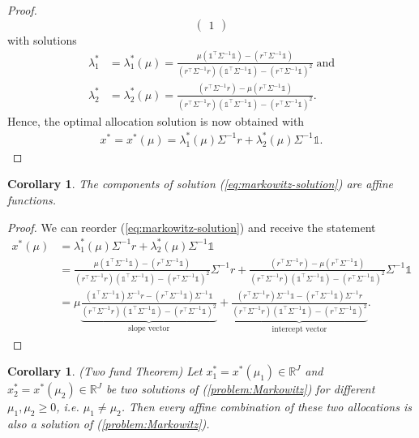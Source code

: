 \documentclass[a4paper, english, 11pt, onecolumn, oneside, final]{article}
\numberwithin{equation}{section}   %
\newcommand{\R}{\mathbb{R}}                 %
\newcommand{\one}{\mathds 1}
\newcommand{\precision}{\Sigma^{-1}}
\newcommand{\A}{r^\top\Sigma^{-1} r}
\newcommand{\B}{r^\top\Sigma^{-1}\one}
\newcommand{\C}{\one^\top\Sigma^{-1}\one}
\newcommand{\D}{(\A)(\C)-(\B)^2}
\theoremstyle{plain}
\newtheorem{corollary}  [theorem]{Corollary}
\theoremstyle{definition}
\theoremstyle{remark}
\begin{document}
\begin{proof}
\begin{equation*}
\begin{pmatrix}
            1
        \end{pmatrix}
    \end{equation*}
    with solutions 
    \begin{equation*}
        \begin{aligned}
            \lambda_1^* &= \lambda_1^*(\mu) = \frac{\mu(\C)-(\B)}{(\A)(\C)-(\B)^2}\;\text{and} \\
            \lambda_2^* &= \lambda_2^*(\mu) = \frac{(\A)-\mu(\B)}{(\A)(\C)-(\B)^2}.
        \end{aligned}
    \end{equation*}
    Hence, the optimal allocation solution is now obtained with
    \begin{equation*}
        \begin{aligned}
            x^* = x^*(\mu) = \lambda_1^*(\mu)\precision r + \lambda_2^*(\mu)\precision\one.
        \end{aligned}
    \end{equation*}
\end{proof}
\begin{corollary}
\label{cor:AffineFunction}
    The components of solution (\ref{eq:markowitz-solution}) are affine functions.
\end{corollary}
\begin{proof}
    We can reorder (\ref{eq:markowitz-solution}) and receive the statement
    \begin{equation}
    \label{eq:AffineFunction}
        \begin{aligned}
            x^*(\mu) &=
            \lambda_1^*(\mu)\precision r + \lambda_2^*(\mu)\precision\one \\
            &= \frac{\mu(\C)-(\B)}{(\A)(\C)-(\B)^2}\precision r + \frac{(\A)-\mu(\B)}{(\A)(\C)-(\B)^2}\precision\one \\
            &= \mu\underbrace{\frac{(\C)\precision r - (\B)\precision\one}{\D}}_{\text{slope vector}} + \underbrace{\frac{(\A)\precision\one - (\B)\precision r}{\D}}_{\text{intercept vector}}.
        \end{aligned}
    \end{equation}
\end{proof}
\begin{corollary}\emph{(Two fund Theorem)}
\label{cor:TwoFundTheorem}
    Let $x_1^* = x^*(\mu_1)\in\R^J$ and $x_2^* = x^*(\mu_2)\in\R^J$ be two solutions of (\ref{problem:Markowitz}) for different $\mu_1,\mu_2\geq0$, i.e. $\mu_1\neq\mu_2$. Then every affine combination of these two allocations is also a solution of (\ref{problem:Markowitz}).
\end{corollary}
\end{document}
